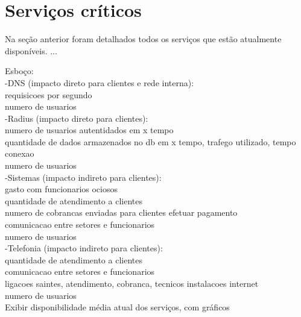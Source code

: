 \section{Serviços críticos}
\label{section:servcrit}

Na seção anterior foram detalhados todos os serviços que estão atualmente disponíveis.
...

Esboço:\\
-DNS (impacto direto para clientes e rede interna): \\
requisicoes por segundo\\
numero de usuarios\\
-Radius (impacto direto para clientes): \\
numero de usuarios autentidados em x tempo\\
quantidade de dados armazenados no db em x tempo, trafego utilizado, tempo conexao\\
numero de usuarios\\
-Sistemas (impacto indireto para clientes): \\
gasto com funcionarios ociosos\\
quantidade de atendimento a clientes\\
numero de cobrancas enviadas para clientes efetuar pagamento\\
comunicacao entre setores e funcionarios\\
numero de usuarios\\
-Telefonia (impacto indireto para clientes): \\
quantidade de atendimento a clientes\\
comunicacao entre setores e funcionarios\\
ligacoes saintes, atendimento, cobranca, tecnicos instalacoes internet\\
numero de usuarios\\

Exibir disponibilidade média atual dos serviços, com gráficos

